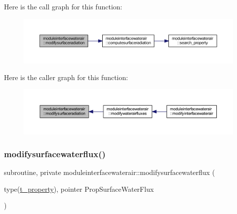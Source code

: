 Here is the call graph for this function\+:\nopagebreak
\begin{figure}[H]
\begin{center}
\leavevmode
\includegraphics[width=350pt]{namespacemoduleinterfacewaterair_a57d8dae2ec14a4562c48bbccb24a5f96_cgraph}
\end{center}
\end{figure}
Here is the caller graph for this function\+:\nopagebreak
\begin{figure}[H]
\begin{center}
\leavevmode
\includegraphics[width=350pt]{namespacemoduleinterfacewaterair_a57d8dae2ec14a4562c48bbccb24a5f96_icgraph}
\end{center}
\end{figure}
\mbox{\label{namespacemoduleinterfacewaterair_a88a4ad4c4d7d19f977f8154341d169fd}} 
\subsubsection{\texorpdfstring{modifysurfacewaterflux()}{modifysurfacewaterflux()}}
{\footnotesize\ttfamily subroutine, private moduleinterfacewaterair\+::modifysurfacewaterflux (\begin{DoxyParamCaption}\item[{type(\mbox{\hyperlink{structmoduleinterfacewaterair_1_1t__property}{t\+\_\+property}}), pointer}]{Prop\+Surface\+Water\+Flux }\end{DoxyParamCaption})\hspace{0.3cm}{\ttfamily [private]}}

